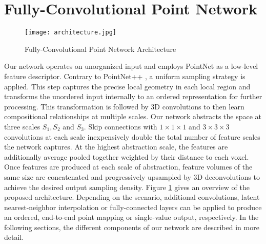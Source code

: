 \documentclass[runningheads]{llncs}
\begin{document}
\section{Fully-Convolutional Point Network}

\begin{figure}[h]
    \centering
 \texttt{[image: architecture.jpg]} 
    \caption{Fully-Convolutional Point Network Architecture}
    \label{fig:architecture} 
\end{figure}




\noindent
Our network operates on unorganized input and employs PointNet \cite{Qi2017} as a low-level feature descriptor. Contrary to PointNet++ \cite{Qi2017_2}, a uniform sampling strategy is applied. This step captures the precise local geometry in each local region and transforms the unordered input internally to an ordered representation for further processing. This transformation is followed by 3D convolutions to then learn compositional relationships at multiple scales. Our network abstracts the space at three scales $S_1, S_2$ and $S_3$. Skip connections with $1\times 1\times 1$ and $3\times 3\times 3$ convolutions at each scale inexpensively double the total number of feature scales the network captures. At the highest abstraction scale, the features are additionally average pooled together weighted by their distance to each voxel. Once features are produced at each scale of abstraction, feature volumes of the same size are concatenated and progressively upsampled by 3D deconvolutions to achieve the desired output sampling density. Figure \ref{fig:architecture} gives an overview of the proposed architecture. Depending on the scenario, additional convolutions, latent nearest-neighbor interpolation or fully-connected layers can be applied to produce an ordered, end-to-end point mapping or single-value output, respectively. In the following sections, the different components of our network are described in more detail.\\
\end{document}
